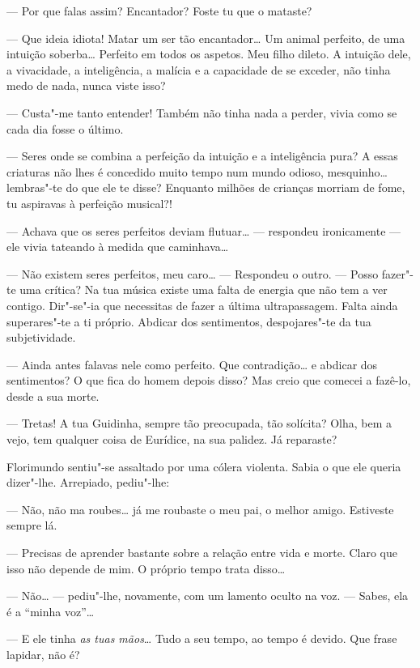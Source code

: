 --- Por que falas assim? Encantador? Foste tu que o mataste?

--- Que ideia idiota! Matar um ser tão encantador\ldots{} Um animal perfeito,
de uma intuição soberba\ldots{} Perfeito em todos os aspetos. Meu filho
dileto. A intuição dele, a vivacidade, a inteligência, a malícia e a
capacidade de se exceder, não tinha medo de nada, nunca viste isso?

--- Custa"-me tanto entender! Também não tinha nada a perder, vivia como se
cada dia fosse o último.

--- Seres onde se combina a perfeição da intuição e a inteligência pura? A
essas criaturas não lhes é concedido muito tempo num mundo odioso,
mesquinho\ldots{} lembras"-te do que ele te disse? Enquanto milhões de crianças
morriam de fome, tu aspiravas à perfeição musical?!

--- Achava que os seres perfeitos deviam flutuar\ldots{} --- respondeu
ironicamente ---  ele vivia tateando à medida que caminhava\ldots{}

--- Não existem seres perfeitos, meu caro\ldots{} --- Respondeu o outro. --- Posso
fazer"-te uma crítica? Na tua música existe uma falta de energia que não
tem a ver contigo. Dir"-se"-ia que necessitas de fazer a última
ultrapassagem. Falta ainda superares"-te a ti próprio. Abdicar dos
sentimentos, despojares"-te da tua subjetividade.

--- Ainda antes falavas nele como perfeito. Que contradição\ldots{} e
abdicar dos sentimentos? O que fica do homem depois disso? Mas creio que
comecei a fazê-lo, desde a sua morte.

--- Tretas! A tua Guidinha, sempre tão preocupada, tão solícita? Olha, bem
a vejo, tem qualquer coisa de Eurídice, na sua palidez. Já reparaste?

Florimundo sentiu"-se assaltado por uma cólera violenta. Sabia o que ele
queria dizer"-lhe. Arrepiado, pediu"-lhe:

--- Não, não ma roubes\ldots{} já me roubaste o meu pai, o melhor amigo.
Estiveste sempre lá.

--- Precisas de aprender bastante sobre a relação entre vida e morte.
Claro que isso não depende de mim. O próprio tempo trata disso\ldots{}

--- Não\ldots{} --- pediu"-lhe, novamente, com um lamento oculto na voz. --- Sabes,
ela é a ``minha voz''\ldots{}

--- E ele tinha \emph{as tuas mãos}\ldots{} Tudo a seu tempo, ao tempo é devido. Que
frase lapidar, não é?

